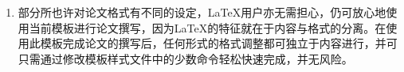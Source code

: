 \begin{enumerate}
\begin{itemize}
             \verb|\def\cleardoublepage{\clearpage}|

             这一命令使产生空白页的机制失效。这一方案将移除所有的空白页，包括封面处的。但与方案一不同的是，页面页脚的设定可以区分奇偶页。
         \item 在thesis.tex的documentclass中添加openany选项(openany与doublesided和printcopy都可搭配)。这一命令使章可以开始于任意页。同时，将artratex.sty中和thesis.tex中的cleardoublepage改为clearpage。此方案将移除所有的用于调整章的起始位置的空白页，而不包括封面处的。同时，页面页脚的设定可以区分奇偶页。
     \end{itemize}
      无论哪种方案都要注意对页眉页脚的影响并做出合适的调整。推荐是采用默认设置，尽量避免将精力花在这些无关紧要的细节上。\LaTeX{}的特点是标准化，而其导致的问题则是任何脱离标准的修改都将花费相当精力。对于电子档的论文，在thesis.tex的documentclass中，若不想使用doublesided，则可使用singlesided来减少空白页。而对于打印版，启用printcopy选项以替换doublesided/singlesided选项，这样可使奇偶页的排版在打印装订后更美观。

  \item 部分所也许对论文格式有不同的设定，\LaTeX{}用户亦无需担心，仍可放心地使用当前模板进行论文撰写，因为\LaTeX{}的特征就在于内容与格式的分离。在使用此模板完成论文的撰写后，任何形式的格式调整都可独立于内容进行，并可只需通过修改模板样式文件中的少数命令轻松快速完成，并无风险。
\end{enumerate}



